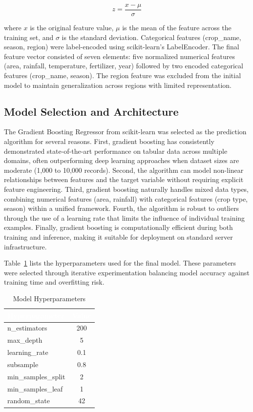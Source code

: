 \documentclass[12pt,a4paper,oneside]{report}
\begin{document}
\begin{equation}
z = \frac{x - \mu}{\sigma}
\end{equation}

where \(x\) is the original feature value, \(\mu\) is the mean of the feature across the training set, and \(\sigma\) is the standard deviation. Categorical features (crop\_name, season, region) were label-encoded using scikit-learn's LabelEncoder. The final feature vector consisted of seven elements: five normalized numerical features (area, rainfall, temperature, fertilizer, year) followed by two encoded categorical features (crop\_name, season). The region feature was excluded from the initial model to maintain generalization across regions with limited representation.

\subsection{Model Selection and Architecture}
The Gradient Boosting Regressor from scikit-learn was selected as the prediction algorithm for several reasons. First, gradient boosting has consistently demonstrated state-of-the-art performance on tabular data across multiple domains, often outperforming deep learning approaches when dataset sizes are moderate (1,000 to 10,000 records). Second, the algorithm can model non-linear relationships between features and the target variable without requiring explicit feature engineering. Third, gradient boosting naturally handles mixed data types, combining numerical features (area, rainfall) with categorical features (crop type, season) within a unified framework. Fourth, the algorithm is robust to outliers through the use of a learning rate that limits the influence of individual training examples. Finally, gradient boosting is computationally efficient during both training and inference, making it suitable for deployment on standard server infrastructure.

Table~\ref{tab:hyperparams} lists the hyperparameters used for the final model. These parameters were selected through iterative experimentation balancing model accuracy against training time and overfitting risk.

\begin{table}[H]
\centering
\caption{Model Hyperparameters}
\label{tab:hyperparams}
\renewcommand{\arraystretch}{1.4}
\begin{tabularx}{\textwidth}{Xc}
\toprule
\rowcolor{headerblue}
\textcolor{white}{\textbf{Hyperparameter}} & \textcolor{white}{\textbf{Value}} \\
\midrule
n\_estimators & 200 \\
\rowcolor{rowalt}
max\_depth & 5 \\
learning\_rate & 0.1 \\
\rowcolor{rowalt}
subsample & 0.8 \\
min\_samples\_split & 2 \\
\rowcolor{rowalt}
min\_samples\_leaf & 1 \\
random\_state & 42 \\
\bottomrule
\end{tabularx}
\end{table}
\end{document}
